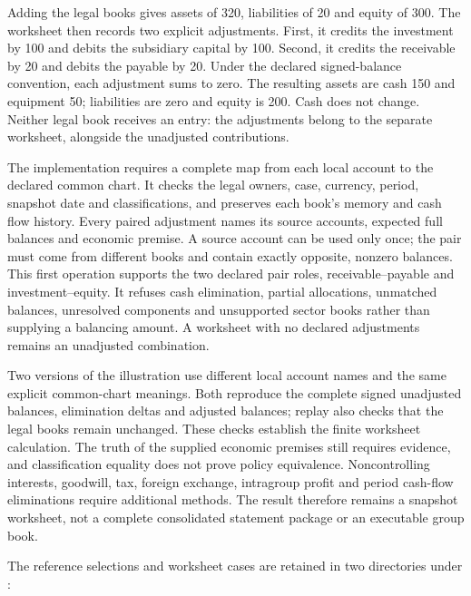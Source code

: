 Adding the legal books gives assets of 320, liabilities of 20 and equity of
300. The worksheet then records two explicit adjustments. First, it credits
the investment by 100 and debits the subsidiary capital by 100. Second, it
credits the receivable by 20 and debits the payable by 20. Under the declared
signed-balance convention, each adjustment sums to zero. The resulting assets
are cash 150 and equipment 50; liabilities are zero and equity is 200. Cash
does not change. Neither legal book receives an entry: the adjustments belong
to the separate worksheet, alongside the unadjusted contributions.

The implementation requires a complete map from each local account to the
declared common chart. It checks the legal owners, case, currency, period,
snapshot date and classifications, and preserves each book's memory and cash
flow history. Every paired adjustment names its source accounts, expected
full balances and economic premise. A source account can be used only once;
the pair must come from different books and contain exactly opposite,
nonzero balances. This first operation supports the two declared pair roles,
receivable--payable and investment--equity. It refuses cash elimination,
partial allocations, unmatched balances, unresolved components and unsupported
sector books rather than supplying a balancing amount. A worksheet with no
declared adjustments remains an unadjusted combination.

Two versions of the illustration use different local account names and the
same explicit common-chart meanings. Both reproduce the complete signed
unadjusted balances, elimination deltas and adjusted balances; replay also
checks that the legal books remain unchanged. These checks establish the
finite worksheet calculation. The truth of the supplied economic premises
still requires evidence, and classification equality does not prove policy
equivalence. Noncontrolling interests, goodwill, tax, foreign exchange,
intragroup profit and period cash-flow eliminations require additional methods.
The result therefore remains a snapshot worksheet, not a complete consolidated
statement package or an executable group book.

The reference selections and worksheet cases are retained in two directories
under :
\begin{flushleft}\small
{}\\
\end{flushleft}



